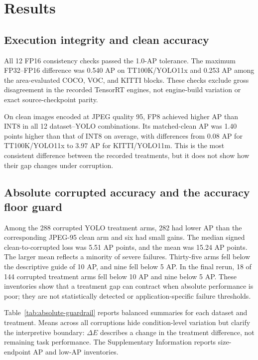 \documentclass[a4paper,fleqn]{cas-dc}
\begin{document}
\section{Results}
\label{sec:results}

\subsection{Execution integrity and clean accuracy}
\label{sec:clean-results}

All 12 FP16 consistency checks passed the 1.0-AP tolerance. The maximum FP32--FP16 difference was 0.540 AP on TT100K/YOLO11x and 0.253 AP among the area-evaluated COCO, VOC, and KITTI blocks. These checks exclude gross disagreement in the recorded TensorRT engines, not engine-build variation or exact source-checkpoint parity.

On clean images encoded at JPEG quality 95, FP8 achieved higher AP than INT8 in all 12 dataset--YOLO combinations. Its matched-clean AP was 1.40 points higher than that of INT8 on average, with differences from 0.08 AP for TT100K/YOLO11x to 3.97 AP for KITTI/YOLO11m. This is the most consistent difference between the recorded treatments, but it does not show how their gap changes under corruption.

\subsection{Absolute corrupted accuracy and the accuracy floor guard}
\label{sec:absolute-results}

Among the 288 corrupted YOLO treatment arms, 282 had lower AP than the corresponding JPEG-95 clean arm and six had small gains. The median signed clean-to-corrupted loss was 5.51 AP points, and the mean was 15.24 AP points. The larger mean reflects a minority of severe failures. Thirty-five arms fell below the descriptive guide of 10 AP, and nine fell below 5 AP. In the final rerun, 18 of 144 corrupted treatment arms fell below 10 AP and nine below 5 AP. These inventories show that a treatment gap can contract when absolute performance is poor; they are not statistically detected or application-specific failure thresholds.

Table~\ref{tab:absolute-guardrail} reports balanced summaries for each dataset and treatment. Means across all corruptions hide condition-level variation but clarify the interpretive boundary: $\Delta E$ describes a change in the treatment difference, not remaining task performance. The Supplementary Information reports size-endpoint AP and low-AP inventories.
\end{document}
